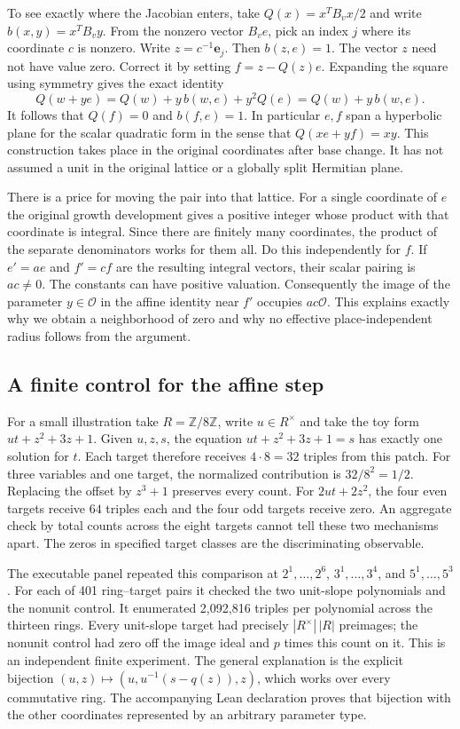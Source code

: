 \documentclass[12pt,letterpaper]{article}
\begin{document}
To see exactly where the Jacobian enters, take $Q(x)=x^TB_vx/2$ and write $b(x,y)=x^TB_vy$. From the nonzero vector $B_ve$, pick an index $j$ where its coordinate $c$ is nonzero. Write $z=c^{-1}\mathbf e_j$. Then $b(z,e)=1$. The vector $z$ need not have value zero. Correct it by setting $f=z-Q(z)e$. Expanding the square using symmetry gives the exact identity
\[
 Q(w+ye)=Q(w)+y\,b(w,e) + y^2Q(e)
         =Q(w)+y\,b(w,e).
\]
It follows that $Q(f)=0$ and $b(f,e)=1$. In particular $e,f$ span a hyperbolic plane for the scalar quadratic form in the sense that $Q(xe+yf)=xy$. This construction takes place in the original coordinates after base change. It has not assumed a unit in the original lattice or a globally split Hermitian plane.

There is a price for moving the pair into that lattice. For a single coordinate of $e$ the original growth development gives a positive integer whose product with that coordinate is integral. Since there are finitely many coordinates, the product of the separate denominators works for them all. Do this independently for $f$. If $e'=ae$ and $f'=cf$ are the resulting integral vectors, their scalar pairing is $ac\ne0$. The constants can have positive valuation. Consequently the image of the parameter $y\in\mathcal O$ in the affine identity near $f'$ occupies $ac\mathcal O$. This explains exactly why we obtain a neighborhood of zero and why no effective place-independent radius follows from the argument.

\subsection{A finite control for the affine step}

For a small illustration take $R=\mathbb Z/8\mathbb Z$, write $u\in R^\times$ and take the toy form $ut+z^2+3z+1$. Given $u,z,s$, the equation $ut+z^2+3z+1=s$ has exactly one solution for $t$. Each target therefore receives $4\cdot 8=32$ triples from this patch. For three variables and one target, the normalized contribution is $32/8^2=1/2$. Replacing the offset by $z^3+1$ preserves every count. For $2ut+2z^2$, the four even targets receive $64$ triples each and the four odd targets receive zero. An aggregate check by total counts across the eight targets cannot tell these two mechanisms apart. The zeros in specified target classes are the discriminating observable.

The executable panel repeated this comparison at $2^1,\ldots,2^6$, $3^1,\ldots,3^4$, and $5^1,\ldots,5^3$. For each of 401 ring--target pairs it checked the two unit-slope polynomials and the nonunit control. It enumerated 2,092,816 triples per polynomial across the thirteen rings. Every unit-slope target had precisely $|R^\times|\,|R|$ preimages; the nonunit control had zero off the image ideal and $p$ times this count on it. This is an independent finite experiment. The general explanation is the explicit bijection $(u,z)\mapsto(u,u^{-1}(s-q(z)),z)$, which works over every commutative ring. The accompanying Lean declaration proves that bijection with the other coordinates represented by an arbitrary parameter type.
\end{document}
